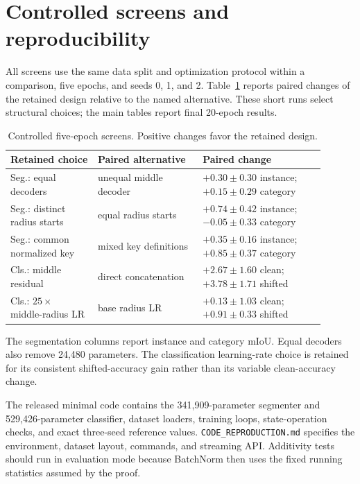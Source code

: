 \documentclass[review,12pt,authoryear]{elsarticle}
\begin{document}
\section{Controlled screens and reproducibility}

All screens use the same data split and optimization protocol within a comparison, five epochs, and seeds 0, 1, and 2. Table~\ref{tab:screens} reports paired changes of the retained design relative to the named alternative. These short runs select structural choices; the main tables report final 20-epoch results.

\begin{table}[htbp]
\centering
\caption{Controlled five-epoch screens. Positive changes favor the retained design.}
\label{tab:screens}
\small
\begin{tabular}{p{0.25\linewidth}p{0.30\linewidth}p{0.35\linewidth}}
\toprule
Retained choice & Paired alternative & Paired change\\
\midrule
Seg.: equal decoders & unequal middle decoder & \(+0.30\pm0.30\) instance; \(+0.15\pm0.29\) category\\
Seg.: distinct radius starts & equal radius starts & \(+0.74\pm0.42\) instance; \(-0.05\pm0.33\) category\\
Seg.: common normalized key & mixed key definitions & \(+0.35\pm0.16\) instance; \(+0.85\pm0.37\) category\\
Cls.: middle residual & direct concatenation & \(+2.67\pm1.60\) clean; \(+3.78\pm1.71\) shifted\\
Cls.: \(25\times\) middle-radius LR & base radius LR & \(+0.13\pm1.03\) clean; \(+0.91\pm0.33\) shifted\\
\bottomrule
\end{tabular}
\end{table}

The segmentation columns report instance and category mIoU. Equal decoders also remove 24,480 parameters. The classification learning-rate choice is retained for its consistent shifted-accuracy gain rather than its variable clean-accuracy change.

The released minimal code contains the 341,909-parameter segmenter and 529,426-parameter classifier, dataset loaders, training loops, state-operation checks, and exact three-seed reference values. \texttt{CODE\_REPRODUCTION.md} specifies the environment, dataset layout, commands, and streaming API. Additivity tests should run in evaluation mode because BatchNorm then uses the fixed running statistics assumed by the proof.
\end{document}
